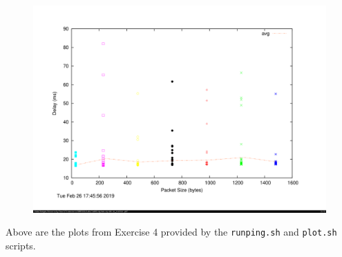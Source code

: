\documentclass[a4paper,11pt]{article}
\newcommand{\code}{\texttt}
\begin{document}
		\begin{figure}[!htb]
		    \centering
		    \begin{minipage}{\textwidth}
		        \centering
		        \includegraphics[width=\linewidth, height=0.43\textheight]{uqscatter.png}
		    \end{minipage}
		\end{figure}
Above are the plots from Exercise 4 provided by the \code{runping.sh} and \code{plot.sh} scripts.
\end{document}
